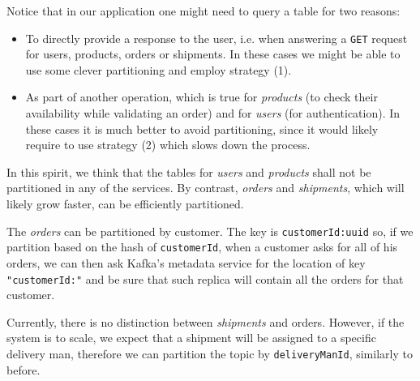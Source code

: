 \noindent
Notice that in our application one might need to query a table for two reasons:
\begin{itemize}
    \item To directly provide a response to the user, i.e. when answering a \texttt{GET} request for users, products, orders or shipments. In these cases we might be able to use some clever partitioning and employ strategy (1).
    \item As part of another operation, which is true for \emph{products} (to check their availability while validating an order) and for \emph{users} (for authentication). In these cases it is much better to avoid partitioning, since it would likely require to use strategy (2) which slows down the process.
\end{itemize}
In this spirit, we think that the tables for \emph{users} and \emph{products} shall not be partitioned in any of the services. By contrast, \emph{orders} and \emph{shipments}, which will likely grow faster, can be efficiently partitioned.

The \emph{orders} can be partitioned by customer. The key is \texttt{customerId:uuid} so, if we partition based on the hash of \texttt{customerId}, when a customer asks for all of his orders, we can then ask Kafka's metadata service for the location of key \texttt{"customerId:"} and be sure that such replica will contain all the orders for that customer.

Currently, there is no distinction between \emph{shipments} and orders. However, if the system is to scale, we expect that a shipment will be assigned to a specific delivery man, therefore we can partition the topic by \texttt{deliveryManId}, similarly to before.

